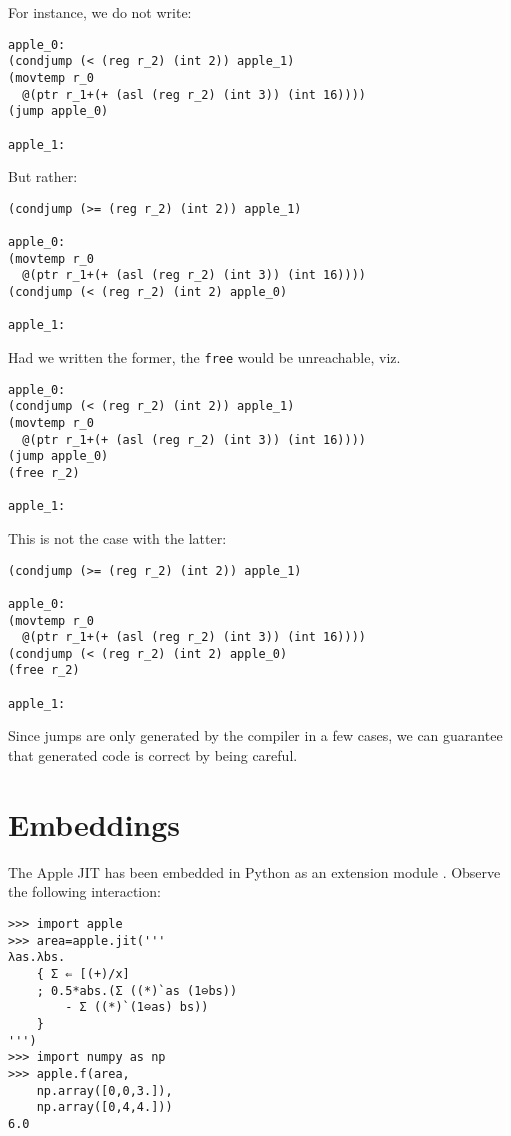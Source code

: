 \documentclass[sigplan,screen,anonymous]{acmart}
\begin{document}
For instance, we do not write:

\begin{verbatim}
apple_0:
(condjump (< (reg r_2) (int 2)) apple_1)
(movtemp r_0
  @(ptr r_1+(+ (asl (reg r_2) (int 3)) (int 16))))
(jump apple_0)

apple_1:
\end{verbatim}

But rather:

\begin{verbatim}
(condjump (>= (reg r_2) (int 2)) apple_1)

apple_0:
(movtemp r_0
  @(ptr r_1+(+ (asl (reg r_2) (int 3)) (int 16))))
(condjump (< (reg r_2) (int 2) apple_0)

apple_1:
\end{verbatim}

Had we written the former, the {\tt free} would be unreachable, viz.

\begin{verbatim}
apple_0:
(condjump (< (reg r_2) (int 2)) apple_1)
(movtemp r_0
  @(ptr r_1+(+ (asl (reg r_2) (int 3)) (int 16))))
(jump apple_0)
(free r_2)

apple_1:
\end{verbatim}

This is not the case with the latter:

\begin{verbatim}
(condjump (>= (reg r_2) (int 2)) apple_1)

apple_0:
(movtemp r_0
  @(ptr r_1+(+ (asl (reg r_2) (int 3)) (int 16))))
(condjump (< (reg r_2) (int 2) apple_0)
(free r_2)

apple_1:
\end{verbatim}

Since jumps are only generated by the compiler in a few cases, we can guarantee that generated code is correct by being careful.

\section{Embeddings}

The Apple JIT has been embedded in Python as an extension module \cite{pythonext}. Observe the following interaction:

\begin{verbatim}
>>> import apple
>>> area=apple.jit('''
λas.λbs.
    { Σ ⇐ [(+)/x]
    ; 0.5*abs.(Σ ((*)`as (1⊖bs))
        - Σ ((*)`(1⊖as) bs))
    }
''')
>>> import numpy as np
>>> apple.f(area,
    np.array([0,0,3.]),
    np.array([0,4,4.]))
6.0
\end{verbatim}
\end{document}
